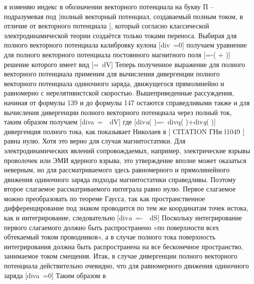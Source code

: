 \documentclass[11pt]{article}
\begin{document}
я изменяю индекс в обозначении векторного потенциала на букву П --
подразумевая под {[}\overrightarrow{{{A}_{}}}{]}полный векторный
потенциал, создаваемый полным током, в отличие от векторного потенциала
{[}\overrightarrow{{{A}_{H}}}{]}, который согласно классической
электродинамической теории создаётся только токами переноса. Выбирая для
полного векторного потенциала калибровку кулона
{[}div~=0{]} получаем уравнение для полного
векторного потенциала постоянного магнитного поля
{[}\Delta {}=-\left(
+{{}\emph{{}} \right){]}
решение которого имеет вид
{[}=~dV{]}
Теперь полученное выражение для полного векторного потенциала применим
для вычисления дивергенции полного векторного потенциала одиночного
заряда, движущегося прямолинейно и равномерно с нерелятивистской
скоростью. Вышеприведенные рассуждения, начиная от формулы 139 и до
формулы 147 остаются справедливыми также и для вычисления дивергенции
полного векторного потенциала через полный ток, таким образом получаем
{[}di{{v}}{a}}~=~~dV{]}
где {[}di{{v}\emph{{a}}\left( 
\right)=-~di{{v}}{q}}\left( 
\right)+di{{v}\emph{{q}}\left(
{{}}{}} \right){]} дивергенция полного тока, как
показывает Николаев в {[} CITATION ГНи \l 1049 {]} равна нулю. Хотя это
верно для случая магнитостатики. Для электродинамических явлений
сопровождаемых, например, электрические взрывы проволочек или ЭМИ
ядерного взрыва, это утверждение вполне может оказаться неверным, но для
рассматриваемого здесь равномерного и прямолинейного движения одиночного
заряда подходы магнитостатики справедливы. Поэтому второе слагаемое
рассматриваемого интеграла равно нулю. Первое слагаемое можно
преобразовать по теореме Гаусса, так как пространственное
дифференцирование под знаком проводится по тем же координатам точек
истока, как и интегрирование, следовательно
{[}di{{v}\emph{{a}}~=-~~dS{]}
Поскольку интегрирование первого слагаемого должно быть распространено
«по поверхности всех обтекаемый током проводников», а в случае полного
тока поверхность интегрирования должна быть распространена на все
бесконечное пространство, занимаемое током смещения. Итак, в случае
дивергенции полного векторного потенциала действительно очевидно, что
для равномерного движения одиночного заряда
{[}di{{v}}{a}}~=0{]} Таким образом в
\end{document}
